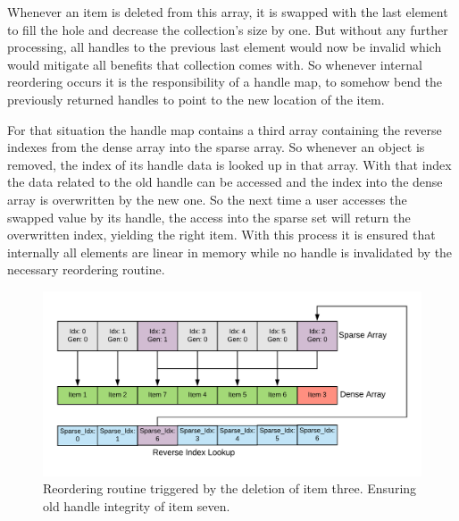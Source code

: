 \noindent
Whenever an item is deleted from this array, it is swapped with the last element to fill the hole and decrease the collection's size by one. But without any further processing, all handles to the previous last element would now be invalid which would mitigate all benefits that collection comes with. So whenever internal reordering occurs it is the responsibility of a handle map, to somehow bend the previously returned handles to point to the new location of the item.

For that situation the handle map contains a third array containing the reverse indexes from the dense array into the sparse array. So whenever an object is removed, the index of its handle data is looked up in that array. With that index the data related to the old handle can be accessed and the index into the dense array is overwritten by the new one. So the next time a user accesses the swapped value by its handle, the access into the sparse set will return the overwritten index, yielding the right item. With this process it is ensured that internally all elements are linear in memory while no handle is invalidated by the necessary reordering routine. 

\begin{figure}[h!]
	\centering \includegraphics[width=\linewidth]{PICs/handle_map_deletion.png}
	\caption{Reordering routine triggered by the deletion of item three. Ensuring old handle integrity of item seven.}
	\label{fig:handle_map_deletion}
\end{figure}

